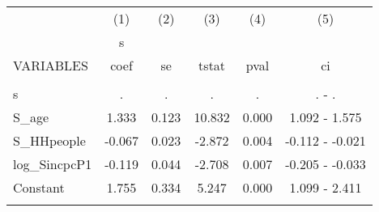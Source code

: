 \documentclass[]{article}
\begin{document}
\begin{tabular}{lccccc} \hline
 & (1) & (2) & (3) & (4) & (5) \\
 & s &  &  &  &  \\
VARIABLES & coef & se & tstat & pval & ci \\ \hline
 &  &  &  &  &  \\
s & . & . & . & . & . - . \\
S\_age & 1.333 & 0.123 & 10.832 & 0.000 & 1.092 - 1.575 \\
S\_HHpeople & -0.067 & 0.023 & -2.872 & 0.004 & -0.112 - -0.021 \\
log\_SincpcP1 & -0.119 & 0.044 & -2.708 & 0.007 & -0.205 - -0.033 \\
Constant & 1.755 & 0.334 & 5.247 & 0.000 & 1.099 - 2.411 \\
 &  &  &  &  &  \\ \hline
\end{tabular}
\end{document}
